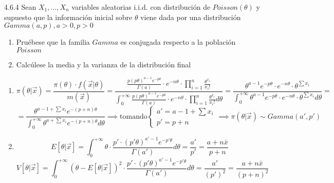 \begin{problem}{4.6.4}
  Sean $X_1, \ldots, X_n$ variables aleatorias i.i.d. con distribución de $Poisson(\theta)$ y supuesto que la información inicial sobre $\theta$ viene dada por una distribución $Gamma(a, p), a > 0, p > 0$
  \begin{enumerate}
    \item Pruébese que la familia $Gamma$ es conjugada respecto a la población $Poisson$
    \item Calcúlese la media y la varianza de la distribución final
  \end{enumerate}
\end{problem}
\begin{sol}
  \begin{enumerate}
    \item $$\pi(\theta | \vec{x}) = \frac{\pi(\theta) \cdot f(\vec{x} | \theta)}{m(\vec{x})} = \frac{\frac{p(p\theta)^{a-1} e^{-p\theta}}{\Gamma(a)} \cdot e^{-n\theta}\cdot \prod_{i=1}^{n} \frac{\theta^{x_i}}{x_i!}}{\int_{0}^{+\infty} \frac{p(p\theta)^{a-1} e^{-p\theta}}{\Gamma(a)} \cdot e^{-n\theta}\cdot \prod_{i=1}^{n} \frac{\theta^{x_i}}{x_i!} d\theta} = \frac{\theta^{a - 1}e^{-p\theta} \cdot e^{-n\theta}\cdot \theta^{\sum x_i}}{\int_{0}^{+\infty} \theta^{a-1}e^{-p\theta} \cdot e^{-n\theta}\cdot \theta^{\sum x_i} d\theta} = $$
    $$ = \frac{\theta^{a - 1 + \sum x_i} e^{-(p + n)\theta}}{\int_{0}^{+\infty} \theta^{a + \sum x_i} e^{-(p + n)\theta} d\theta} \implies \text{tomando} \begin{cases}
      a' = a - 1 + \sum x_i \\
      p' = p + n
    \end{cases} \implies \pi(\theta | \vec{x}) \sim Gamma(a', p')$$
    \item $$E[\theta | \vec{x}] = \int_{0}^{+\infty} \theta \cdot \frac{p' \cdot (p'\theta)^{a' - 1} e^{-p'\theta}}{\Gamma(a')} d\theta = \frac{a'}{p'} = \frac{a + n\bar{x}}{p + n}$$
    $$V[\theta | \vec{x}] = \int_{0}^{+\infty} (\theta - E[\theta | \vec{x}])^2 \cdot \frac{p' \cdot (p'\theta)^{a' - 1} e^{-p'\theta}}{\Gamma(a')} d\theta = \frac{a'}{(p')^2} = \frac{a + n\bar{x}}{(p + n)^2}$$
    \end{enumerate}
\end{sol}

